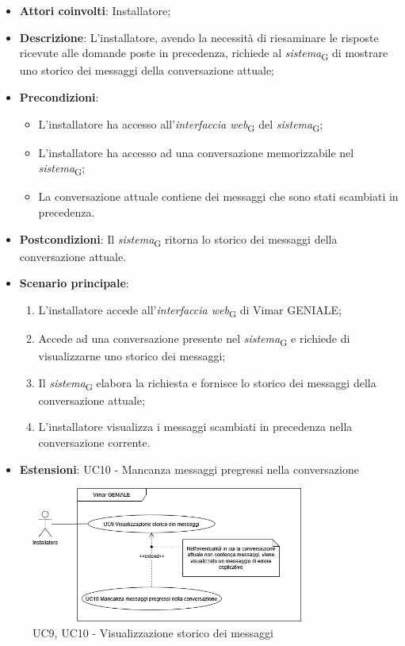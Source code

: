 \begin{itemize}
    \item \textbf{Attori coinvolti}: Installatore;
    \item \textbf{Descrizione}: L’installatore, avendo la necessità di riesaminare le risposte ricevute alle domande poste in precedenza, richiede al \textit{sistema}\textsubscript{G} di mostrare uno storico dei messaggi della conversazione attuale;
    \item \textbf{Precondizioni}: 
        \begin{itemize}
            \item L’installatore ha accesso all’\textit{interfaccia web}\textsubscript{G} del \textit{sistema}\textsubscript{G};
            \item L’installatore ha accesso ad una conversazione memorizzabile nel \textit{sistema}\textsubscript{G};
            \item La conversazione attuale contiene dei messaggi che sono stati scambiati in precedenza.
        \end{itemize}
    \item \textbf{Postcondizioni}: Il \textit{sistema}\textsubscript{G} ritorna lo storico dei messaggi della conversazione attuale.
    \item \textbf{Scenario principale}:
    \begin{enumerate}
    \item L’installatore accede all’\textit{interfaccia web}\textsubscript{G} di Vimar GENIALE;
    \item Accede ad una conversazione presente nel \textit{sistema}\textsubscript{G} e richiede di visualizzarne uno storico dei messaggi;
    \item Il \textit{sistema}\textsubscript{G} elabora la richiesta e fornisce lo storico dei messaggi della conversazione attuale;
    \item L’installatore visualizza i messaggi scambiati in precedenza nella conversazione corrente.
    \end{enumerate}
    \item \textbf{Estensioni}: UC10 - Mancanza messaggi pregressi nella conversazione
\end{itemize}
\begin{figure}[H]
\centering
\includegraphics[width=0.8\textwidth]{contents/casi_duso/png/UC9.png}
\caption{UC9, UC10 - Visualizzazione storico dei messaggi}
\end{figure}

